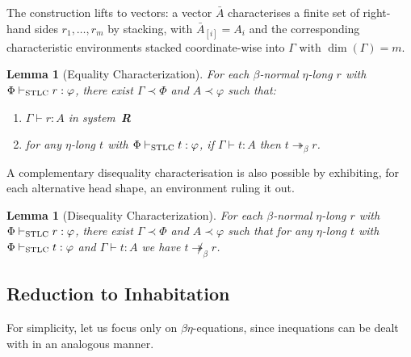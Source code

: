 \documentclass{easychair}
\theoremstyle{plain}%
\newtheorem{lemma}[theorem]{Lemma}
\renewcommand{\:}{\mbox{:}\xspace}
\begin{document}
The construction lifts to vectors: a vector $\bar{A}$ characterises a finite set of right-hand sides $r_1, \ldots, r_m$ by stacking, with $\bar{A}_{[i]} = A_i$ and the corresponding characteristic environments stacked coordinate-wise into $\Gamma$ with $\dim(\Gamma) = m$.

\begin{lemma}[Equality Characterization]\label{lem:char}
For each $\beta$-normal $\eta$-long $r$ with $\Phi \vdash_{\textnormal{STLC}} r : \varphi$, there exist $\Gamma \prec \Phi$ and $A \prec \varphi$ such that:
\begin{enumerate}
\item $\Gamma \vdash r : A$ in system~\textbf{R}
\item for any $\eta$-long $t$ with $\Phi \vdash_{\textnormal{STLC}} t : \varphi$, if $\Gamma \vdash t : A$ then $t \twoheadrightarrow_\beta r$.
\end{enumerate}
\end{lemma}

A complementary disequality characterisation is also possible by exhibiting, for each alternative head shape, an environment ruling it out.

\begin{lemma}[Disequality Characterization]\label{lem:neq_character}
For each $\beta$-normal $\eta$-long $r$ with $\Phi \vdash_{\textnormal{STLC}} r : \varphi$, there exist $\Gamma \prec \Phi$ and $A \prec \varphi$ such that for any $\eta$-long $t$ with $\Phi \vdash_{\textnormal{STLC}} t : \varphi$ and $\Gamma \vdash t : A$ we have $t \not\twoheadrightarrow_\beta r$.
\end{lemma}

\subsection{Reduction to Inhabitation}

For simplicity, let us focus only on $\beta\eta$-equations, since inequations can be dealt with in an analogous manner.
\end{document}

